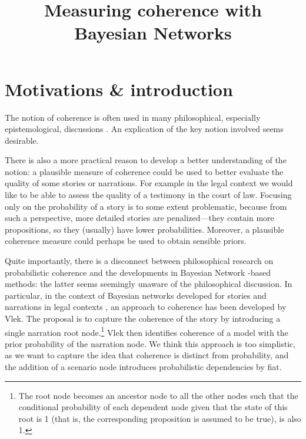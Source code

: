 \documentclass[10pt,]{scrartcl}
\title{Measuring coherence with Bayesian Networks}
\author{}
\date{\vspace{-2.5em}}
\begin{document}
\maketitle

\section{Motivations \& introduction}

The notion of coherence is often used in many philosophical, especially
epistemological, discussions \citep[for instance, in discussions about the
truth-conduciveness of coherence,][]{shogenji1999conducive,olsson2001conducive}. An explication of the key notion
involved seems desirable.

There is also a more practical reason to develop a better understanding
of the notion: a plausible measure of coherence could be used to better
evaluate the quality of some stories or narrations. For example in the
legal context we would like to be able to assess the quality of a
testimony in the court of law. Focusing only on the probability of a
story is to some extent problematic, because from such a perspective,
more detailed stories are penalized---they contain more propositions,
so they (usually) have lower probabilities.  Moreover, a plausible coherence
measure could perhaps be used to obtain sensible priors.

Quite importantly, there is a disconnect between philosophical research on probabilistic coherence and the developments in Bayesian Network -based methods: the latter seems  seemingly unaware of the philosophical discussion. In particular, in the context of Bayesian networks developed
for stories and narrations in legal contexts  \citep{vlek2013modeling,vlek2014building,vlek2015,vlek2016method,vlek2016stories,fenton2013general}, an approach to coherence has been
developed by Vlek. The proposal is to capture the coherence of the story
by introducing a single narration root node.\footnote{The root node  becomes an ancestor
node to all the other nodes such that the conditional probability of
each dependent node given that the state of this root is 1 (that is, the
corresponding proposition is assumed to be true), is also 1.}  Vlek then identifies
coherence of a model with the prior probability of the narration node. We think this approach is too simplistic, as we want to capture the idea that coherence is distinct
from probability, and  the addition of a scenario node  introduces probabilistic
dependencies by fiat. 
\end{document}

